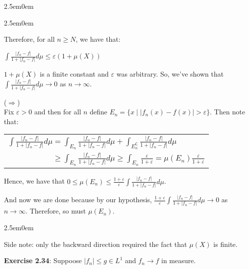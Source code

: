 \documentclass{book}
\newcommand{\exPPP}{%
   \color{VioletRed}%
   \fontsize{12}{14}\selectfont%
}
\newenvironment{myIndent}{%
   \begin{adjustwidth}{2.5em}{0em}%
}{%
   \end{adjustwidth}%
}
\newcommand{\blab}[1]{\textbf{#1}}
\newcommand{\comp}{\mathsf{C}}
\newcommand{\retTwo}{\hfill\bigbreak}
\begin{document}
\begin{myIndent}
\begin{myIndent}
		Therefore, for all $n \geq N$, we have that:

		{\center $\int \frac{|f_n - f|}{1 + |f_n - f|}d\mu \leq \varepsilon( 1 + \mu(X))$ \retTwo\par}

		$1 + \mu(X)$ is a finite constant and $\varepsilon$ was arbitrary. So, we've shown that\\ $\int \frac{|f_n - f|}{1 + |f_n - f|}d\mu \rightarrow 0$ as $n \rightarrow \infty$.\retTwo

		($\Longrightarrow$)\\
		Fix $\varepsilon > 0$ and then for all $n$ define $E_n = \{x \mid |f_n(x) - f(x)| > \varepsilon\}$. Then note that:

		{\centering\begin{tabular}{l}
			$\int \frac{|f_n-f|}{1 + |f_n-f|}d\mu = \int_{E_n}\frac{|f_n-f|}{1 + |f_n-f|}d\mu + \int_{E_n^{\comp}}\frac{|f_n-f|}{1 + |f_n-f|}d\mu$\\ [8pt]

			$\phantom{\int \frac{|f_n-g|}{1 + |f_n-f|}d\mu} \geq \int_{E_n}\frac{|f_n-f|}{1 + |f_n-f|}d\mu \geq \int_{E_n} \frac{\varepsilon}{1 + \varepsilon} = \mu(E_n)\frac{\varepsilon}{1 + \varepsilon}$
		\end{tabular} \retTwo\par}

		Hence, we have that $0 \leq \mu(E_n) \leq \frac{1 + \varepsilon}{\varepsilon}\int \frac{|f_n-f|}{1 + |f_n-f|}d\mu$.\retTwo

		And now we are done because by our hypothesis, $\frac{1 + \varepsilon}{\varepsilon}\int \frac{|f_n-f|}{1 + |f_n-f|}d\mu \rightarrow 0$ as $n \rightarrow \infty$. Therefore, so must $\mu(E_n)$.
		
		\begin{myIndent}\exPPP
			Side note: only the backward direction required the fact that $\mu(X)$ is finite.\retTwo
		\end{myIndent}
	\end{myIndent}
\end{myIndent}

\blab{Exercise 2.34}: Suppoose $|f_n| \leq g \in L^1$ and $f_n \rightarrow f$ in measure.
\end{document}
